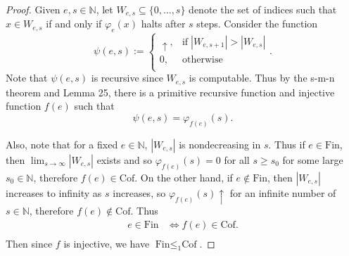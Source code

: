 \documentclass{article}
\begin{document}
\begin{enumerate}[label={\bf Q\arabic*:}]
    \begin{proof}
      Given $e,s\in\mathbb{N}$, let $W_{e,s}\subseteq\{0,\ldots,s\}$ denote
      the set of indices such that $x\in W_{e,s}$ if and only if
      $\varphi_e(x)$ halts after $s$ steps. Consider the function
      \begin{equation*}
        \psi(e,s) :=
        \begin{cases}
          \uparrow, &\text{if}\; |W_{e,s+1}|>|W_{e,s}|\\
          0, &\text{otherwise}\\
        \end{cases}.
      \end{equation*}
      Note that $\psi(e,s)$ is recursive since $W_{e,s}$ is computable.
      Thus by the s-m-n theorem and Lemma 25, there is a primitive
      recursive function and injective function $f(e)$ such that
      \[\psi(e,s)=\varphi_{f(e)}(s).\]

      Also, note that for a fixed $e\in\mathbb{N}$, $|W_{e,s}|$ is
      nondecreasing in $s$. Thus if $e\in\text{Fin}$, then
      $\lim_{s\rightarrow\infty}|W_{e,s}|$ exists and so
      $\varphi_{f(e)}(s)=0$ for all $s\geq s_0$ for some large
      $s_0\in\mathbb{N}$, therefore $f(e)\in\text{Cof}$. On the other hand,
      if $e\not\in\text{Fin}$, then $|W_{e,s}|$ increases to infinity as
      $s$ increases, so $\varphi_{f(e)}(s)\uparrow$ for an infinite
      number of $s\in\mathbb{N}$, therefore $f(e)\not\in\text{Cof}$. Thus
      \begin{align*}
        e\in\text{Fin} &\Leftrightarrow f(e)\in\text{Cof}.\\
      \end{align*}
      Then since $f$ is injective, we have $\text{Fin}\leq_1\text{Cof}$.
    \end{proof}
\end{enumerate}
\end{document}
